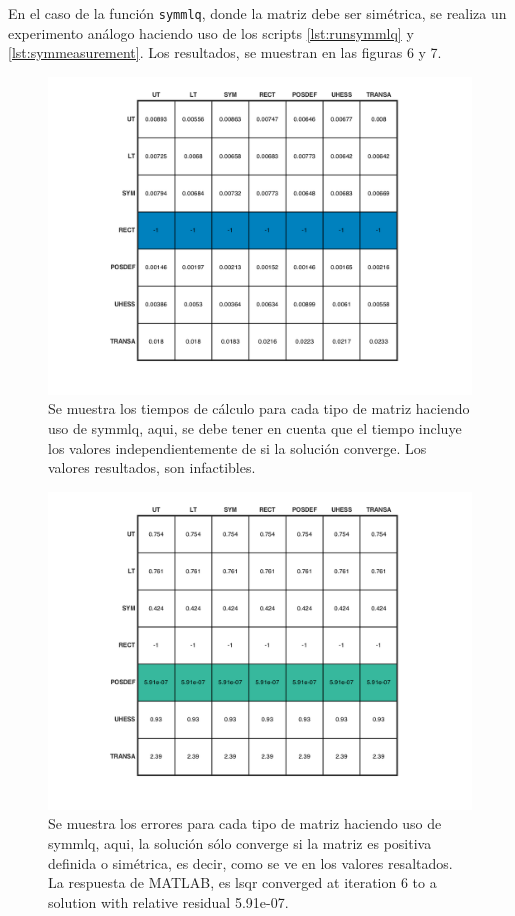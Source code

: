 \documentclass[11pt, spanish]{article}
\begin{document}
\begin{enumerate}
En el caso de la función \texttt{symmlq}, donde la matriz debe ser simétrica, se realiza un experimento análogo haciendo uso de los scripts \ref{lst:runsymmlq} y \ref{lst:symmeasurement}. Los resultados, se muestran en las figuras 6 y 7.

\begin{figure}[h]
\centering
	\includegraphics[scale=0.8]{data/img/plotsymmlq_times}
	\caption{Se muestra los tiempos de cálculo para cada tipo de matriz haciendo uso de symmlq, aqui, se debe tener en cuenta que el tiempo incluye los valores independientemente de si la solución converge. Los valores resultados, son infactibles.}
\end{figure}

\begin{figure}[h]
\centering
	\includegraphics[scale=0.8]{data/img/plotsymmlq_error}
	\caption{Se muestra los errores para cada tipo de matriz haciendo uso de symmlq, aqui, la solución sólo converge si la matriz es positiva definida o simétrica, es decir, como se ve en los valores resaltados. La respuesta de MATLAB, es lsqr converged at iteration 6 to a solution with relative residual 5.91e-07.}
\end{figure}


\end{enumerate}
\end{document}
